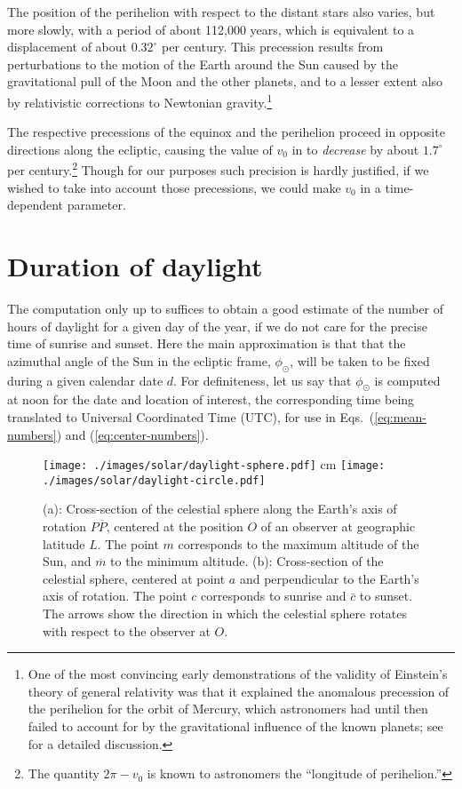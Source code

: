 The position of the perihelion with respect to the distant stars also varies, but more slowly, with a period of about 112,000 years, which is equivalent to a displacement of about $0.32^\circ$ per century.  This precession results from perturbations to the motion of the Earth around the Sun caused by the gravitational pull of the Moon and the other planets, and to a lesser extent also by relativistic corrections to Newtonian gravity.\footnote{One of the most convincing early demonstrations of the validity of Einstein's theory of general relativity was that it explained the anomalous precession of the perihelion for the orbit of Mercury, which astronomers had until then failed to account for by the gravitational influence of the known planets; see \cite{dInverno} for a detailed discussion.}

The respective precessions of the equinox and the perihelion proceed in opposite directions along the ecliptic, causing the value of $v_0$ in  to {\it decrease} by about $1.7^\circ$ per century.\footnote{The quantity $2\pi - v_0$ is known to astronomers the ``longitude of perihelion.''}  Though for our purposes such precision is hardly justified, if we wished to take into account those precessions, we could make $v_0$ in  a time-dependent parameter.

\section{Duration of daylight}

The computation only up to  suffices to obtain a good estimate of the number of hours of daylight for a given day of the year, if we do not care for the precise time of sunrise and sunset.  Here the main approximation is that that the azimuthal angle of the Sun in the ecliptic frame, $\phi_\odot$, will be taken to be fixed during a given calendar date $d$.  For definiteness, let us say that $\phi_\odot$ is computed at noon for the date and location of interest, the corresponding time being translated to Universal Coordinated Time (UTC), for use in Eqs.~(\ref{eq:mean-numbers}) and (\ref{eq:center-numbers}).

\begin{figure} [t]
\begin{center}
	\texttt{[image: ./images/solar/daylight-sphere.pdf]}  cm
	\texttt{[image: ./images/solar/daylight-circle.pdf]}
\end{center}
\caption{\small (a): Cross-section of the celestial sphere along the Earth's axis of rotation $P \overline P$, centered at the position $O$ of an observer at geographic latitude $L$.  The point $m$ corresponds to the maximum altitude of the Sun, and $\overline m$ to the minimum altitude.  (b): Cross-section of the celestial sphere, centered at point $a$ and perpendicular to the Earth's axis of rotation.  The point $c$ corresponds to sunrise and $\bar c$ to sunset.  The arrows show the direction in which the celestial sphere rotates with respect to the observer at $O$.}
\end{figure}

